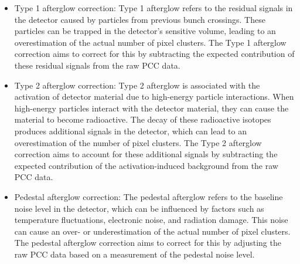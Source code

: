
\begin{itemize}

\item Type 1 afterglow correction: Type 1 afterglow refers to the residual signals in the detector caused by particles from previous bunch crossings. These particles can be trapped in the detector's sensitive volume, leading to an overestimation of the actual number of pixel clusters. The Type 1 afterglow correction aims to correct for this by subtracting the expected contribution of these residual signals from the raw PCC data.

\item Type 2 afterglow correction: Type 2 afterglow is associated with the activation of detector material due to high-energy particle interactions. When high-energy particles interact with the detector material, they can cause the material to become radioactive. The decay of these radioactive isotopes produces additional signals in the detector, which can lead to an overestimation of the number of pixel clusters. The Type 2 afterglow correction aims to account for these additional signals by subtracting the expected contribution of the activation-induced background from the raw PCC data.

\item Pedestal afterglow correction: The pedestal afterglow refers to the baseline noise level in the detector, which can be influenced by factors such as temperature fluctuations, electronic noise, and radiation damage. This noise can cause an over- or underestimation of the actual number of pixel clusters. The pedestal afterglow correction aims to correct for this by adjusting the raw PCC data based on a measurement of the pedestal noise level.

\end{itemize}


